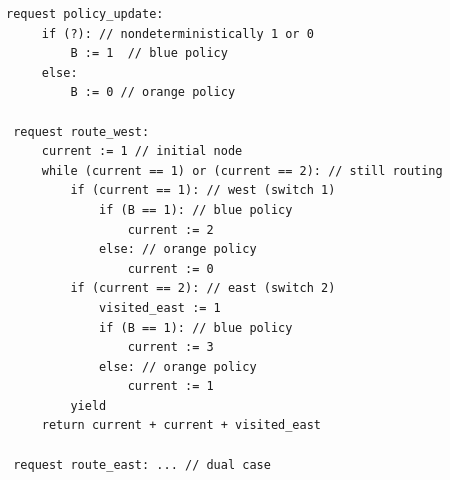 

\begin{center}
\begin{minipage}[!htbp]{1.0\textwidth}
	\begin{lstlisting}[caption={BGP routing (not serializable)},label={lst:BgpNonSerializable},numbers=none]
 request policy_update:
     if (?): // nondeterministically 1 or 0
         B := 1  // blue policy 
     else:
         B := 0 // orange policy
		
 request route_west:
     current := 1 // initial node
     while (current == 1) or (current == 2): // still routing        
         if (current == 1): // west (switch 1)
             if (B == 1): // blue policy
                 current := 2
             else: // orange policy
                 current := 0
         if (current == 2): // east (switch 2)
             visited_east := 1
             if (B == 1): // blue policy
                 current := 3
             else: // orange policy
                 current := 1
         yield
     return current + current + visited_east
     
 request route_east: ... // dual case      
		\end{lstlisting}
\end{minipage}
\end{center}


